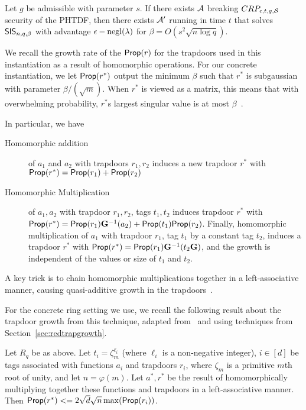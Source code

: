 \begin{theorem}\label{thm:phtdf}
Let $g$ be admissible with parameter $s$. 
If there exists  $\mathcal{A}$ breaking
$CRP_{\epsilon,t,g,\mathcal{S}}$ security of the PHTDF, then there exists
$\mathcal{A}'$ running in time $t$ that solves $\mathsf{SIS}_{n,q,\beta}$ with
advantage $\epsilon-\operatorname{negl}(\lambda)$ for $\beta=O(s^2\sqrt{n
  \log{q}})$. 
\end{theorem}

We recall the growth rate of the $\mathsf{Prop}(r)$ for
the trapdoors used in this instantiation as a result of homomorphic
operations.  For our concrete instantiation, we let $\mathsf{Prop}(r^*)$ output the
minimum $\beta$ such that $r^*$ is subgaussian with parameter
$\beta/(\sqrt{m})$. When $r^*$ is viewed as a matrix, this
means that with overwhelming probability, $r^*$s largest singular
value is at most $\beta$~\cite{vershynin12:_compr_sensin_theor_applic}.

In particular, we have 
\begin{description}
\item[Homomorphic addition] of $a_1$
and $a_2$ with trapdoors $r_1, r_2$ induces a new trapdoor $r^*$ with 
$\mathsf{Prop}(r^*)=\mathsf{Prop}(r_1)+\mathsf{Prop}(r_2)$ 
\item[Homomorphic Multiplication] of $a_1, a_2$ with trapdoor $r_1,
  r_2$, tags $t_1,t_2$ induces trapdoor $r^*$ with 
$\mathsf{Prop}(r^*)=\mathsf{Prop}(r_1)\mathbf{G}^{-1}(a_2)+\mathsf{Prop}(t_1)\mathsf{Prop}(r_2)$. Finally,
homomorphic
multiplication of $a_1$ with trapdoor $r_1$, tag $t_1$
by a constant tag $t_2$, induces a trapdoor $r^*$ with 
$\mathsf{Prop}(r^*)=\mathsf{Prop}(r_1)\mathbf{G}^{-1}(t_2\mathbf{G})$, and the growth is independent of the values or size of $t_1$ and
$t_2$. 
\end{description}
A key trick is to chain homomorphic
multiplications together
in a left-associative manner, causing quasi-additive growth in the
trapdoors~\cite{DBLP:conf/innovations/BrakerskiV14,DBLP:conf/crypto/Alperin-SheriffP14}.



For the concrete ring setting we use, we recall the following result about the trapdoor growth from
this technique, adapted
from~\cite[Corollary 3.6]{DBLP:conf/crypto/Alperin-SheriffP14} and using techniques from
Section~\ref{sec:redtrapgrowth}.
\begin{theorem}\label{thm:asym-growth} Let $R_q$ be as above.
Let $t_i=\zeta_m^{\ell_{i}}$ (where $\ell_{i}$ is a non-negative integer), $i \in [d]$ be tags associated with
functions $a_i$ and trapdoors $r_i$, where $\zeta_m$ is
a primitive $m$th root of unity, and let $n=\varphi(m)$.  
Let $a^*, r^*$ be the result of homomorphically multiplying together
these functions and trapdoors in a left-associative manner. Then 
$\mathsf{Prop}(r^*) <=2\sqrt{d}\sqrt{n}\max(\mathsf{Prop}(r_i))$.
\end{theorem}
